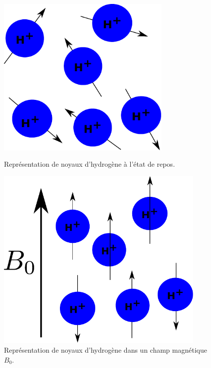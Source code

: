 \begin{figure}[ht]
    \begin{minipage}[c]{0.45\textwidth}
	    \centering
	    \includegraphics[width=0.75\textwidth]{Images/spins.pdf}
	    \caption{\label{fig:spins}Représentation de noyaux d'hydrogène à l'état de repos.}
    \end{minipage}\hfill
    \begin{minipage}[c]{0.45\textwidth}
	    \centering
	    \includegraphics[width=0.9\textwidth]{Images/spin_b0.pdf}
	    \caption{\label{fig:spin_b0}Représentation de noyaux d'hydrogène dans un champ magnétique $B_0$.}
    \end{minipage}
\end{figure}

